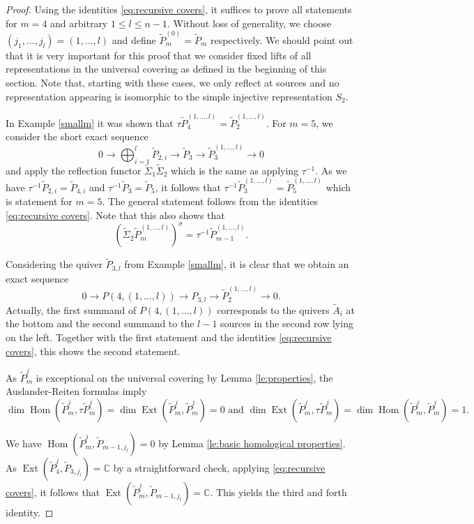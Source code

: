 \documentclass{amsart}
\numberwithin{equation}{section}
\newcommand{\uj}{{\underline j}}
\newcommand{\CC}{\mathbb{C}}
\newcommand{\Ext}{\operatorname{Ext}}
\newcommand{\Hom}{\operatorname{Hom}}
\newcommand{\ses}[3]{0\rightarrow #1\rightarrow #2\rightarrow#3\rightarrow 0}
\begin{document}
\begin{proof}
Using the identities \ref{eq:recursive covers}, it suffices to prove all statements for $m=4$ and arbitrary $1\leq l\leq n-1$. Without loss of generality, we choose $(j_1,\ldots,j_l)=(1,\ldots,l)$ and define $\tilde P_m^{(0)}=\tilde P_m$ respectively. We should point out that it is very important for this proof that we consider fixed lifts of all representations in the universal covering as defined in the beginning of this section. Note that, starting with these cases, we only reflect at sources and no representation appearing is isomorphic to the simple injective representation $S_2$.  


In Example \ref{smallm} it was shown that $\tau \tilde P_4^{(1,\ldots,l)}=\tilde P_2^{(1,\ldots,l)}$. For $m=5$,  we consider the short exact sequence
\[\ses{\bigoplus_{i=1}^l\tilde P_{2,i}}{\tilde P_3}{\tilde P_3^{(1,\ldots,l)}}\]
and apply the reflection functor $\tilde\Sigma_1\tilde\Sigma_2$ which is the same as applying $\tau^{-1}$. As we have $\tau^{-1} \tilde P_{2,i}=\tilde P_{4,i}$ and $\tau^{-1}\tilde P_3=\tilde P_5$, it follows that $\tau^{-1}\tilde P_3^{(1,\ldots,l)}=\tilde P_5^{(1,\ldots,l)}$ which is statement for $m=5$. The general statement follows from the identities \ref{eq:recursive covers}. Note that this also shows that
\[(\tilde \Sigma_2\tilde P_{m}^{(1,\ldots,l)})^\sigma=\tau^{-1}\tilde P^{(1,\ldots,l)}_{m-1}.\]


Considering the quiver $\tilde P_{3,l}$ from Example \ref{smallm}, it is clear that we obtain an exact sequence
$$\ses{P(4,(1,\ldots,l))}{P_{3,l}}{\tilde P_2^{(1,\ldots,l)}}.$$
Actually, the first summand of $P(4,(1,\ldots,l))$ corresponds to the quivers $\tilde A_i$ at the bottom and the second summand to the $l-1$ sources in the second row lying on the left. Together with the first statement and the identities \eqref{eq:recursive covers}, this shows the second statement.

As $\tilde P_m^{\uj}$ is exceptional on the universal covering by Lemma \ref{le:properties}, the Auslander-Reiten formulas \cite[Theorem IV.2.13]{ass} imply 
$$\dim\Hom(\tilde P_{m}^{\uj},\tau \tilde P_{m}^{\uj})=\dim\Ext(\tilde P_{m}^{\uj},\tilde P_{m}^{\uj})=0 \text{ and } \dim\Ext(\tilde P_m^{\uj},\tau\tilde P_m^{j})=\dim\Hom(\tilde P_{m}^{\uj},\tilde P_{m}^{\uj})=1.$$

We have $\Hom(\tilde P_{m}^{\uj},\tilde P_{m-1,j_l})=0$ by Lemma \ref{le:basic homological properties}. As $\Ext(\tilde P_{4}^{\uj},\tilde P_{3,j_l})=\CC$ by a straightforward check, applying \ref{eq:recursive covers}, it follows that $\Ext(\tilde P_{m}^{\uj},\tilde P_{m-1,j_l})=\CC$. This yields the third and forth identity.




\end{proof}
\end{document}
